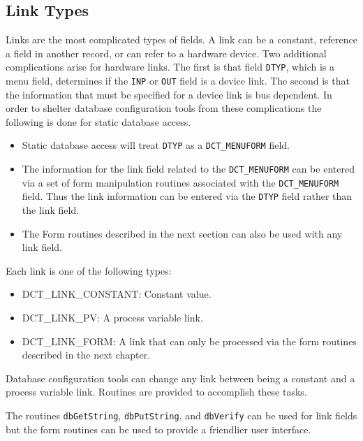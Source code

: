 \subsection{Link Types}

Links are the most complicated types of fields. A link can be a constant, reference a field in another record, or can refer to 
a hardware device. Two additional complications arise for hardware links. The first is that field \verb|DTYP|, which is a menu 
field, determines if the \verb|INP| or \verb|OUT| field is a device link. The second is that the information that must be specified for a 
device link is bus dependent. In order to shelter database configuration tools from these complications the following is 
done for static database access.

\begin{itemize}\item Static database access will treat \verb|DTYP| as a \verb|DCT_MENUFORM| field.

\item The information for the link field related to the \verb|DCT_MENUFORM| can be entered via a set of form manipulation 
routines associated with the \verb|DCT_MENUFORM| field. Thus the link information can be entered via the \verb|DTYP| field 
rather than the link field.

\item The Form routines described in the next section can also be used with any link field.

\end{itemize}Each link is one of the following types:

\begin{itemize}\item {}DCT\_LINK\_CONSTANT: Constant value.

\item {}DCT\_LINK\_PV: A process variable link.

\item {}DCT\_LINK\_FORM: A link that can only be processed via the form routines described in the next chapter.

\end{itemize}Database configuration tools can change any link between being a constant and a process variable link. Routines are 
provided to accomplish these tasks.

The routines \verb|dbGetString|, \verb|dbPutString|, and \verb|dbVerify| can be used for link fields but the form routines can be 
used to provide a friendlier user interface.

